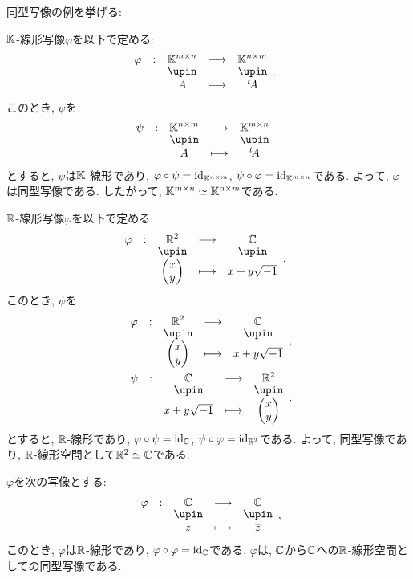 同型写像の例を挙げる:
\begin{example}
  $\mathbb{K}$-線形写像$\varphi$を以下で定める:
  \begin{align*}
    &\shazo{\varphi}{\KK^{m\times n}}{\KK^{n\times m}}{A}{\transposed{A}}.
  \end{align*}
  このとき,
  $\psi$を
  \begin{align*}
    &\shazo{\psi}{\KK^{n\times m}}{\KK^{m\times n}}{A}{\transposed{A}}
  \end{align*}
  とすると,
  $\psi$は$\mathbb{K}$-線形であり, $\varphi\circ \psi=\operatorname{id}_{\mathbb{K}^{n\times m}}$, $\psi\circ\varphi=\operatorname{id}_{\mathbb{K}^{m\times n}}$である.
  よって, $\varphi$は同型写像である.
  したがって, $\mathbb{K}^{m\times n}\simeq\mathbb{K}^{n\times m}$である.
\end{example}


\begin{example}
  $\mathbb{R}$-線形写像$\varphi$を以下で定める:
  \begin{align*}
    &\shazo{\varphi}{\RR^2}{\CC}{\begin{pmatrix}x\\y\end{pmatrix}}{x+y\sqrt{-1}}.
  \end{align*}
  このとき,
  $\psi$を
  \begin{align*}
    &\shazo{\varphi}{\RR^2}{\CC}{\begin{pmatrix}x\\y\end{pmatrix}}{x+y\sqrt{-1}},\\
   &\shazo{\psi}{\CC}{\RR^2}{x+y\sqrt{-1}}{\begin{pmatrix}x\\y\end{pmatrix}}.
  \end{align*}
  とすると,
  $\mathbb{R}$-線形であり,
  $\varphi\circ \psi=\operatorname{id}_{\mathbb{C}}$,
  $\psi\circ\varphi=\operatorname{id}_{\mathbb{R}^2}$である.
  よって, 同型写像であり,
  $\mathbb{R}$-線形空間として$\mathbb{R}^2\simeq\mathbb{C}$である.
\end{example}

\begin{example}
  $\varphi$を次の写像とする:
  \begin{align*}
    \shazo{\varphi}{\CC}{\CC}{z}{\overline{z}},
  \end{align*}
  このとき, $\varphi$は$\mathbb{R}$-線形であり, $\varphi\circ\varphi=\operatorname{id}_{\mathbb{C}}$である.
  $\varphi$は, $\mathbb{C}$から$\mathbb{C}$への$\mathbb{R}$-線形空間としての同型写像である.
\end{example}


